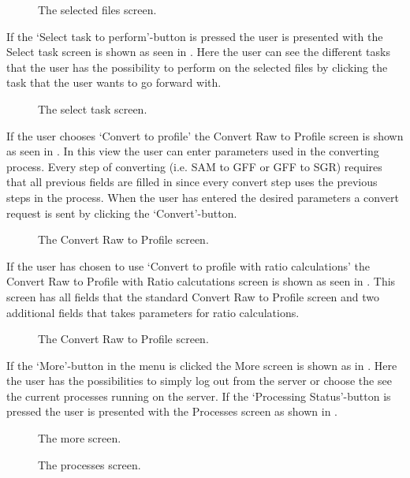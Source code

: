 \begin{figure}[htb]
\caption{The selected files screen.}
\label{fig:ios_selectedFiles1}
\end{figure}

\FloatBarrier
If the ‘Select task to perform’-button is pressed the user is presented with the Select task screen is shown as seen in . Here the user can see the different tasks that the user has the possibility to perform on the selected files by clicking the task that the user wants to go forward with. 

\begin{figure}[htb]
\caption{The select task screen.}
\label{fig:ios_selectTask}
\end{figure}
\FloatBarrier
If the user chooses ‘Convert to profile’ the Convert Raw to Profile screen is shown as seen in . In this view the user can enter parameters used in the converting process. Every step of converting (i.e. SAM to GFF or GFF to SGR) requires that all previous fields are filled in since every convert step uses the previous steps in the process. When the user has entered the desired parameters a convert request is sent by clicking the ‘Convert’-button. 

\begin{figure}[htb]
\caption{The Convert Raw to Profile screen.}
\label{fig:ios_convertRawToProfile}
\end{figure}
\FloatBarrier

If the user has chosen to use ‘Convert to profile with ratio calculations’ the Convert Raw to Profile with Ratio calcutations screen is shown as seen in . This screen has all fields that the standard Convert Raw to Profile screen and two additional fields that takes parameters for ratio calculations. 

\begin{figure}[htb]
\caption{The Convert Raw to Profile screen.}
\label{fig:ios_convertRawToProfileWithRatio}
\end{figure}
\FloatBarrier

If the ‘More’-button in the menu is clicked the More screen is shown as in . Here the user has the possibilities to simply log out from the server or choose the see the current processes running on the server. If the ‘Processing Status’-button is pressed the user is presented with the Processes screen as shown in . 

\begin{figure}[htb]
\caption{The more screen.}
\label{fig:ios_more}
\end{figure}

\begin{figure}[htb]
\caption{The processes screen.}
\label{fig:ios_processes}
\end{figure}
\FloatBarrier









